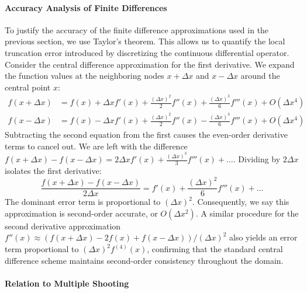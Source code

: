 \paragraph*{Accuracy Analysis of Finite Differences}

To justify the accuracy of the finite difference approximations used in the previous section, we use Taylor's theorem. This allows us to quantify the local truncation error introduced by discretizing the continuous differential operator. Consider the central difference approximation for the first derivative. We expand the function values at the neighboring nodes $x + \Delta x$ and $x - \Delta x$ around the central point $x$:
\begin{align}
    f(x + \Delta x) &= f(x) + \Delta x f'(x) + \frac{(\Delta x)^2}{2} f''(x) + \frac{(\Delta x)^3}{6} f'''(x) + O(\Delta x^4) \\
    f(x - \Delta x) &= f(x) - \Delta x f'(x) + \frac{(\Delta x)^2}{2} f''(x) - \frac{(\Delta x)^3}{6} f'''(x) + O(\Delta x^4)
\end{align}
Subtracting the second equation from the first causes the even-order derivative terms to cancel out. We are left with the difference $f(x + \Delta x) - f(x - \Delta x) = 2\Delta x f'(x) + \frac{(\Delta x)^3}{3} f'''(x) + \dots$. Dividing by $2\Delta x$ isolates the first derivative:
\begin{equation}
    \frac{f(x + \Delta x) - f(x - \Delta x)}{2\Delta x} = f'(x) + \frac{(\Delta x)^2}{6} f'''(x) + \dots
\end{equation}
The dominant error term is proportional to $(\Delta x)^2$. Consequently, we say this approximation is second-order accurate, or $O(\Delta x^2)$. A similar procedure for the second derivative approximation $f''(x) \approx (f(x+\Delta x) - 2f(x) + f(x-\Delta x))/(\Delta x)^2$ also yields an error term proportional to $(\Delta x)^2 f^{(4)}(x)$, confirming that the standard central difference scheme maintains second-order consistency throughout the domain.

\paragraph*{Relation to Multiple Shooting}

